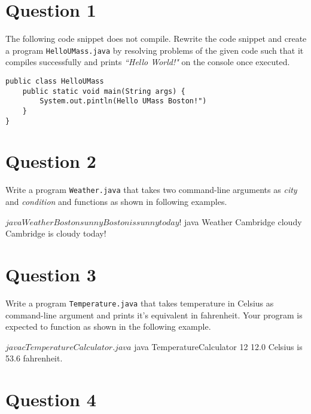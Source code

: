 \documentclass[12pt,letterpaper,twoside]{article}
\begin{document}


\section*{Question 1}

The following code snippet does not compile. Rewrite the code snippet and create a program \texttt{HelloUMass.java} by resolving problems of the given code such that it compiles successfully and prints \textit{``Hello World!"} on the console once executed.

\lstset{language=Java,tabsize=4}
\begin{lstlisting}
public class HelloUMass
	public static void main(String args) {
		System.out.pintln(Hello UMass Boston!")
	}
}
\end{lstlisting}

\section*{Question 2}

Write a program \texttt{Weather.java} that takes two command-line arguments as \textit{city} and \textit{condition} and functions as shown in following examples.

\begin{terminal}
$ java Weather Boston sunny
Boston is sunny today!
$ java Weather Cambridge cloudy
Cambridge is cloudy today!
\end{terminal}

\newpage

\section*{Question 3}

Write a program \texttt{Temperature.java} that takes temperature in Celsius as command-line argument and prints it's equivalent in fahrenheit.
Your program is expected to function as shown in the following example.

\begin{terminal}
$ javac TemperatureCalculator.java
$ java TemperatureCalculator 12
12.0 Celsius is 53.6 fahrenheit.
\end{terminal}

\section*{Question 4}
\end{document}
